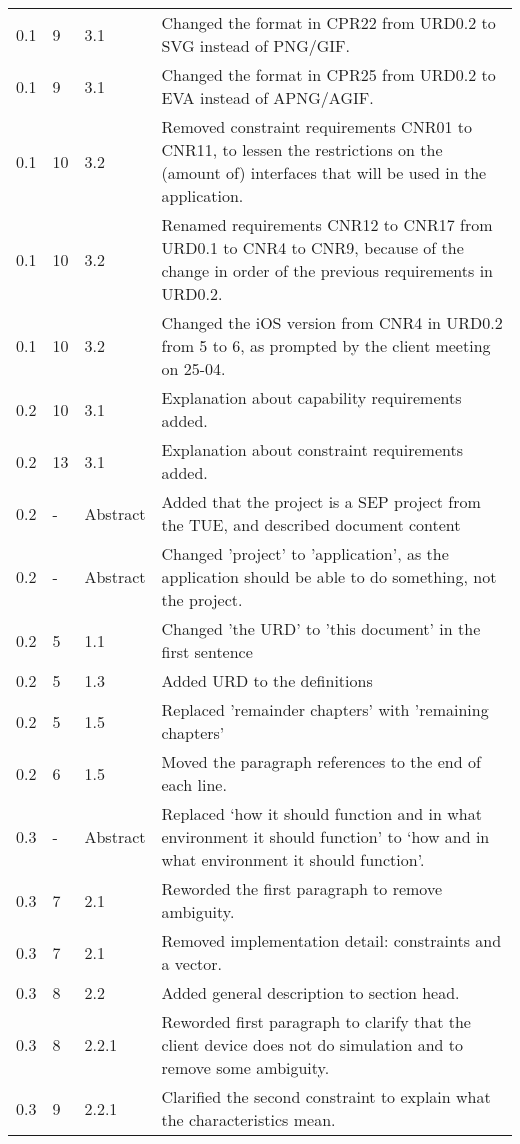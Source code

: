 \begin{longtable}{|l|l|l|p{11cm}|}
   0.1 & 9 & 3.1 & Changed the format in CPR22 from URD0.2 to SVG instead of PNG$/$GIF. \\
   0.1 & 9 & 3.1 & Changed the format in CPR25 from URD0.2 to EVA instead of APNG$/$AGIF. \\
  0.1 & 10 & 3.2 & Removed constraint requirements CNR01 to CNR11, to lessen the restrictions on the (amount of) interfaces that will be used in the application. \\
   0.1 & 10 & 3.2 & Renamed requirements CNR12 to CNR17 from URD0.1 to CNR4 to CNR9, because of the change in order of the previous requirements in URD0.2. \\
  0.1 & 10 & 3.2 & Changed the iOS version from CNR4 in URD0.2 from 5 to 6, as prompted by the client meeting on 25-04. \\
  0.2 & 10 & 3.1 & Explanation about capability requirements added. \\
    0.2 & 13 & 3.1 & Explanation about constraint requirements added. \\
    0.2 & - & Abstract & Added that the project is a SEP project from the TUE, and described document content \\
    0.2 & - & Abstract & Changed 'project' to 'application', as the application should be able to do something, not the project. \\
    0.2 & 5 & 1.1 & Changed 'the URD' to 'this document' in the first sentence \\
    0.2 & 5 & 1.3 & Added URD to the definitions \\
    0.2 & 5 & 1.5 & Replaced 'remainder chapters' with 'remaining chapters' \\
    0.2 & 6 & 1.5 & Moved the paragraph references to the end of each line. \\
    0.3 & - & Abstract & Replaced `how it should function and in what environment it should function' to `how and in what environment it should function'.\\
    0.3 & 7 & 2.1 & Reworded the first paragraph to remove ambiguity. \\
    0.3 & 7 & 2.1 & Removed implementation detail: constraints and a vector. \\
    0.3 & 8 & 2.2 & Added general description to section head. \\
    0.3 & 8 & 2.2.1 & Reworded first paragraph to clarify that the client device does not do simulation and to remove some ambiguity. \\
    0.3 & 9 & 2.2.1 & Clarified the second constraint to explain what the characteristics mean. \\

\end{longtable}
